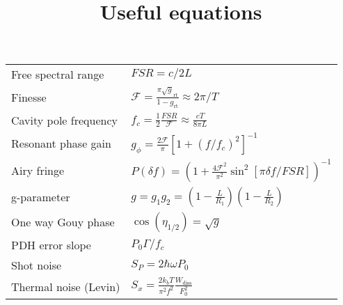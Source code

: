 \documentclass{article}
\begin{document}
\title{Useful equations}
\maketitle

\Large
\begin{tabular}{p{2in}p{4in}}
  Free spectral range & $FSR = c/2 L$\\
  Finesse & $ \mathcal{F} = \frac{\pi \sqrt g_{\mathrm{rt}}}{1-g_{\mathrm{rt}}} \approx 2 \pi/ T$ \\
  Cavity pole frequency & $f_c = \frac{1}{2}\frac{FSR}{\mathcal{F}} \approx \frac{cT}{8\pi L}$\\
  Resonant phase gain & $g_\phi = \frac{2 \mathcal{F}}{\pi}\left[1+\left(f/f_c\right)^2\right]^{-1}$\\
  Airy fringe & $P(\delta f) = \left (1 + \frac{4 \mathcal{F}^2}{\pi^2} \sin^2 [
  \pi \delta f / FSR ] \right)^{-1} $ \\
  g-parameter & $g = g_1g_2 = (1 - \frac{L}{R_1})(1 - \frac{L}{R_2})$ \\
  One way Gouy phase & $\cos(\eta_{1/2}) = \sqrt g$ \\
  PDH error slope  & $P_0 \Gamma / f_c$\\
  Shot noise & $S_P = 2\hbar \omega P_0$\\
  Thermal noise (Levin) &  $S_x = \frac{2k_bT}{\pi^2f^2}\frac{W_{\mathrm{diss}}}{F_0^2}$

\end{tabular}
\end{document}
